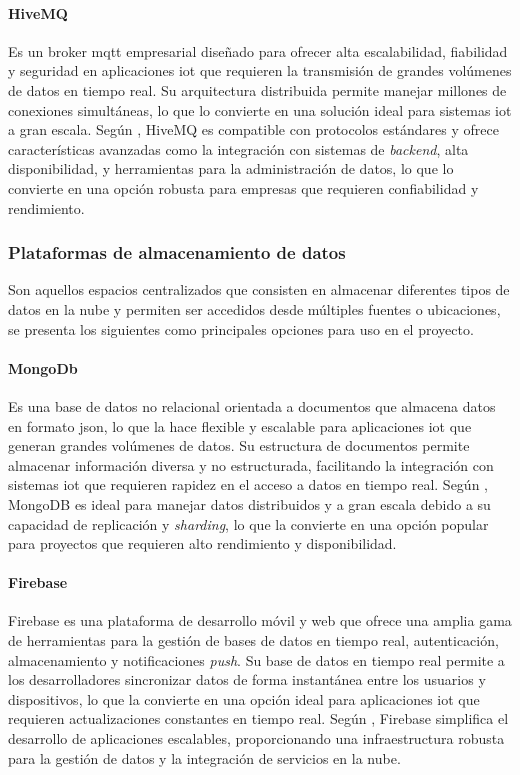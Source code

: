 \paragraph{HiveMQ}
Es un broker \acrshort{mqtt} empresarial diseñado para ofrecer alta escalabilidad, fiabilidad y seguridad en aplicaciones \acrshort{iot} que requieren la transmisión de grandes volúmenes de datos en tiempo real. Su arquitectura distribuida permite manejar millones de conexiones simultáneas, lo que lo convierte en una solución ideal para sistemas \acrshort{iot} a gran escala. Según \cite{wolf2016hivemq}, HiveMQ es compatible con protocolos estándares y ofrece características avanzadas como la integración con sistemas de \textit{backend}, alta disponibilidad, y herramientas para la administración de datos, lo que lo convierte en una opción robusta para empresas que requieren confiabilidad y rendimiento.

\subsubsection{Plataformas de almacenamiento de datos}
Son aquellos espacios centralizados que consisten en almacenar diferentes tipos de datos en la nube y permiten ser accedidos desde múltiples fuentes o ubicaciones, se presenta los siguientes como principales opciones para uso en el proyecto.
\paragraph{MongoDb}
Es una base de datos no relacional orientada a documentos que almacena datos en formato \acrfull{json}, lo que la hace flexible y escalable para aplicaciones \acrshort{iot} que generan grandes volúmenes de datos. Su estructura de documentos permite almacenar información diversa y no estructurada, facilitando la integración con sistemas \acrshort{iot} que requieren rapidez en el acceso a datos en tiempo real. Según \cite{chodorow2013mongodb}, MongoDB es ideal para manejar datos distribuidos y a gran escala debido a su capacidad de replicación y \textit{sharding}, lo que la convierte en una opción popular para proyectos que requieren alto rendimiento y disponibilidad.

\paragraph{Firebase}
Firebase es una plataforma de desarrollo móvil y web que ofrece una amplia gama de herramientas para la gestión de bases de datos en tiempo real, autenticación, almacenamiento y notificaciones \textit{push}. Su base de datos en tiempo real permite a los desarrolladores sincronizar datos de forma instantánea entre los usuarios y dispositivos, lo que la convierte en una opción ideal para aplicaciones \acrshort{iot} que requieren actualizaciones constantes en tiempo real. Según \cite{moffatt2018firebase}, Firebase simplifica el desarrollo de aplicaciones escalables, proporcionando una infraestructura robusta para la gestión de datos y la integración de servicios en la nube.

